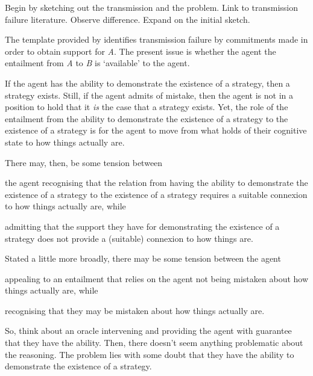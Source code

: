 \documentclass[10pt]{article}
\newcommand{\hozlinedash}[0]{%
  \noindent\hdashrule[0.5ex][c]{\textwidth}{.1pt}{2.5pt}
}
\begin{document}
\begin{note}
  Begin by sketching out the transmission and the problem.
  Link to transmission failure literature.
  Observe difference.
  Expand on the initial sketch.
\end{note}

\hozlinedash

\begin{note}
  The template provided by \citeauthor{Wright:2011wn} identifies transmission failure by commitments made in order to obtain support for \emph{A}.
  The present issue is whether the agent the entailment from \emph{A} to \emph{B} is `available' to the agent.

  If the agent has the ability to demonstrate the existence of a strategy, then a strategy exists.
  Still, if the agent admits of mistake, then the agent is not in a position to hold that it \emph{is} the case that a strategy exists.
  Yet, the role of the entailment from the ability to demonstrate the existence of a strategy to the existence of a strategy is for the agent to move from what holds of their cognitive state to how things actually are.

  There may, then, be some tension between
  \begin{enumerate*}
  \item the agent recognising that the relation from having the ability to demonstrate the existence of a strategy to the existence of a strategy requires a suitable connexion to how things actually are, while
  \item admitting that the support they have for demonstrating the existence of a strategy does not provide a (suitable) connexion to how things are.
  \end{enumerate*}

  Stated a little more broadly, there may be some tension between the agent
  \begin{enumerate*}
  \item appealing to an entailment that relies on the agent not being mistaken about how things actually are, while
  \item recognising that they may be mistaken about how things actually are.
  \end{enumerate*}
\end{note}





\begin{note}[Oracle]
  So, think about an oracle intervening and providing the agent with guarantee that they have the ability.
  Then, there doesn't seem anything problematic about the reasoning.
  The problem lies with some doubt that they have the ability to demonstrate the existence of a strategy.
\end{note}
\end{document}
